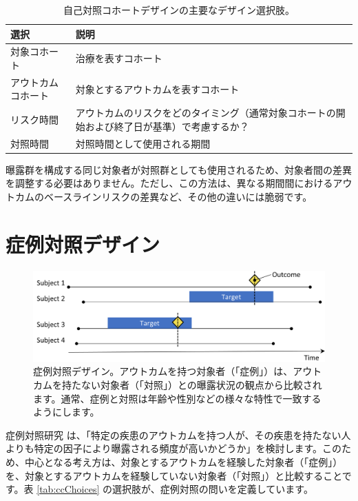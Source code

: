 \documentclass[
  11pt]{book}
\theoremstyle{definition}
\theoremstyle{definition}
\theoremstyle{definition}
\theoremstyle{definition}
\theoremstyle{remark}
\begin{document}
\begin{table}
\centering
\caption{\label{tab:sccChoices}自己対照コホートデザインの主要なデザイン選択肢。}
\centering
\begin{tabular}[t]{l>{\raggedright\arraybackslash}p{9cm}}
\toprule
選択 & 説明\\
\midrule
対象コホート & 治療を表すコホート\\
アウトカムコホート & 対象とするアウトカムを表すコホート\\
リスク時間 & アウトカムのリスクをどのタイミング（通常対象コホートの開始および終了日が基準）で考慮するか？\\
対照時間 & 対照時間として使用される期間\\
\bottomrule
\end{tabular}
\end{table}

曝露群を構成する同じ対象者が対照群としても使用されるため、対象者間の差異を調整する必要はありません。ただし、この方法は、異なる期間間におけるアウ トカムのベースラインリスクの差異など、その他の違いには脆弱です。

\section{症例対照デザイン}\label{ux75c7ux4f8bux5bfeux7167ux30c7ux30b6ux30a4ux30f3}


\begin{figure}[h]

{\centering \includegraphics[width=0.9\linewidth]{images/PopulationLevelEstimation/caseControl} 

}

\caption{症例対照デザイン。アウトカムを持つ対象者（「症例」）は、アウトカムを持たない対象者（「対照」）との曝露状況の観点から比較されます。通常、症例と対照は年齢や性別などの様々な特性で一致するようにします。}\label{fig:caseControl}
\end{figure}

症例対照研究 \citep{vandenbroucke_2012} は、「特定の疾患のアウトカムを持つ人が、その疾患を持たない人よりも特定の因子により曝露される頻度が高いかどうか」を検討します。このため、中心となる考え方は、対象とするアウトカムを経験した対象者（「症例」）を、対象とするアウトカムを経験していない対象者（「対照」）と比較することです。表 \ref{tab:ccChoices} の選択肢が、症例対照の問いを定義しています。  
\end{document}
